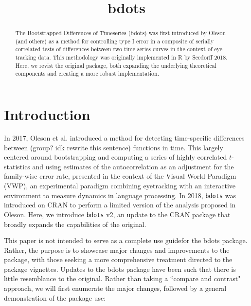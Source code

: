 \documentclass{article}
\title{bdots}
\date{}
\newcommand{\xt}{\texttt}%
\begin{document}

\maketitle

%

\begin{abstract}
The Bootstrapped Differences of Timeseries (bdots) was first introduced by Oleson (and others) as a method for controlling type I error in a composite of serially correlated tests of differences between two time series curves in the context of eye tracking data.  This methodology was originally implemented in R by Seedorff 2018. Here, we revist the original package, both expanding the underlying theoretical components and creating a more robust implementation.
\end{abstract}


\section{Introduction}

In 2017, Oleson et al. introduced a method for detecting time-specific differences between (group? idk rewrite this sentence) functions in time. This largely centered around bootstrapping and computing a series of highly correlated $t$-statistics and using estimates of the autocorrelation as an adjustment for the family-wise error rate, presented in the context of the Visual World Paradigm (VWP), an experimental paradigm combining eyetracking with an interactive environment to measure dynamics in language processing. In 2018, \xt{bdots} was introduced on CRAN to perform a limited version of the analysis proposed in Oleson. Here, we introduce \texttt{bdots} v2, an update to the CRAN package that broadly expands the capabilities of the original. 

This paper is not intended to serve as a complete use guidefor the bdots package. Rather, the purpose is to showcase major changes and improvements to the package, with those seeking a more comprehensive treatment directed to the package vignettes. Updates to the bdots package have been such that there is little resemblance to the original. Rather than taking a ``compare and contrast" approach, we will first enumerate the major changes, followed by a general demonstration of the package use:
\end{document}
